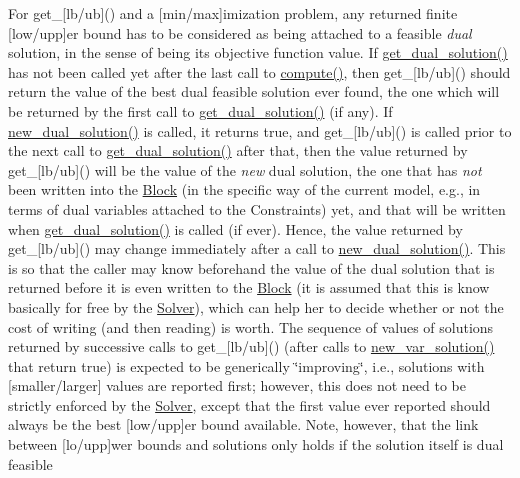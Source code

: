 \begin{DoxyItemize}
\item For get\+\_\+\mbox{[}lb/ub\mbox{]}() and a \mbox{[}min/max\mbox{]}imization problem, any returned finite \mbox{[}low/upp\mbox{]}er bound has to be considered as being attached to a feasible {\itshape dual} solution, in the sense of being its objective function value. If \mbox{\hyperlink{class_s_m_spp__di__unipi__it_1_1_c_d_a_solver_a347d37171494bf83416a48b279b94d5a}{get\+\_\+dual\+\_\+solution()}} has not been called yet after the last call to \mbox{\hyperlink{class_s_m_spp__di__unipi__it_1_1_solver_a504d4e3e174c7a518cc66156a8a45ce5}{compute()}}, then get\+\_\+\mbox{[}lb/ub\mbox{]}() should return the value of the best dual feasible solution ever found, the one which will be returned by the first call to \mbox{\hyperlink{class_s_m_spp__di__unipi__it_1_1_c_d_a_solver_a347d37171494bf83416a48b279b94d5a}{get\+\_\+dual\+\_\+solution()}} (if any). If \mbox{\hyperlink{class_s_m_spp__di__unipi__it_1_1_c_d_a_solver_a8c650415b6673c33692c363abdfdef00}{new\+\_\+dual\+\_\+solution()}} is called, it returns true, and get\+\_\+\mbox{[}lb/ub\mbox{]}() is called prior to the next call to \mbox{\hyperlink{class_s_m_spp__di__unipi__it_1_1_c_d_a_solver_a347d37171494bf83416a48b279b94d5a}{get\+\_\+dual\+\_\+solution()}} after that, then the value returned by get\+\_\+\mbox{[}lb/ub\mbox{]}() will be the value of the {\itshape new} dual solution, the one that has {\itshape not} been written into the \mbox{\hyperlink{class_s_m_spp__di__unipi__it_1_1_block}{Block}} (in the specific way of the current model, e.\+g., in terms of dual variables attached to the Constraints) yet, and that will be written when \mbox{\hyperlink{class_s_m_spp__di__unipi__it_1_1_c_d_a_solver_a347d37171494bf83416a48b279b94d5a}{get\+\_\+dual\+\_\+solution()}} is called (if ever). Hence, the value returned by get\+\_\+\mbox{[}lb/ub\mbox{]}() may change immediately after a call to \mbox{\hyperlink{class_s_m_spp__di__unipi__it_1_1_c_d_a_solver_a8c650415b6673c33692c363abdfdef00}{new\+\_\+dual\+\_\+solution()}}. This is so that the caller may know beforehand the value of the dual solution that is returned before it is even written to the \mbox{\hyperlink{class_s_m_spp__di__unipi__it_1_1_block}{Block}} (it is assumed that this is know basically for free by the \mbox{\hyperlink{class_s_m_spp__di__unipi__it_1_1_solver}{Solver}}), which can help her to decide whether or not the cost of writing (and then reading) is worth. The sequence of values of solutions returned by successive calls to get\+\_\+\mbox{[}lb/ub\mbox{]}() (after calls to \mbox{\hyperlink{class_s_m_spp__di__unipi__it_1_1_solver_af109b504a566c90a4ea45c1574c128fe}{new\+\_\+var\+\_\+solution()}} that return true) is expected to be generically \char`\"{}improving\char`\"{}, i.\+e., solutions with \mbox{[}smaller/larger\mbox{]} values are reported first; however, this does not need to be strictly enforced by the \mbox{\hyperlink{class_s_m_spp__di__unipi__it_1_1_solver}{Solver}}, except that the first value ever reported should always be the best \mbox{[}low/upp\mbox{]}er bound available. Note, however, that the link between \mbox{[}lo/upp\mbox{]}wer bounds and solutions only holds if the solution itself is dual feasible 
\end{DoxyItemize}
